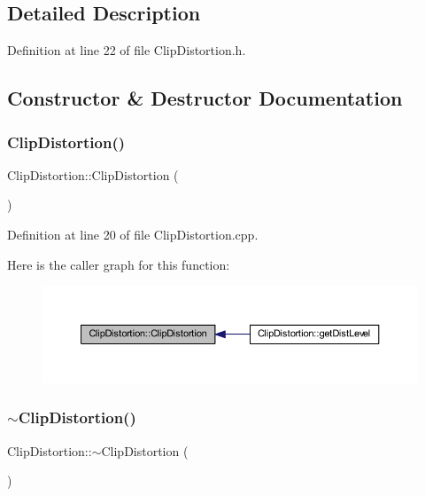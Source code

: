 \subsection{Detailed Description}


Definition at line 22 of file Clip\+Distortion.\+h.



\subsection{Constructor \& Destructor Documentation}
\mbox{\label{class_clip_distortion_a86506486f99934a97cd2de7cceee3f0d}} 
\subsubsection{\texorpdfstring{Clip\+Distortion()}{ClipDistortion()}}
{\footnotesize\ttfamily Clip\+Distortion\+::\+Clip\+Distortion (\begin{DoxyParamCaption}{ }\end{DoxyParamCaption})}



Definition at line 20 of file Clip\+Distortion.\+cpp.

Here is the caller graph for this function\+:
\nopagebreak
\begin{figure}[H]
\begin{center}
\leavevmode
\includegraphics[width=350pt]{d8/da2/class_clip_distortion_a86506486f99934a97cd2de7cceee3f0d_icgraph}
\end{center}
\end{figure}
\mbox{\label{class_clip_distortion_a4128fd1ee6344103f10499bd97ab157f}} 
\subsubsection{\texorpdfstring{$\sim$\+Clip\+Distortion()}{~ClipDistortion()}}
{\footnotesize\ttfamily Clip\+Distortion\+::$\sim$\+Clip\+Distortion (\begin{DoxyParamCaption}{ }\end{DoxyParamCaption})}



